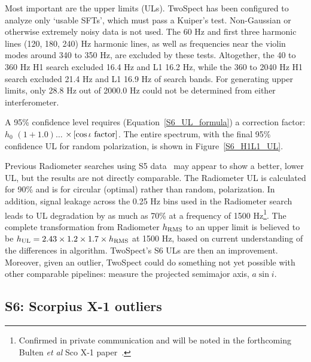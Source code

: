 Most important are the upper limits (ULs).
TwoSpect has been configured to analyze only `usable SFTs', which must pass a Kuiper's test.
Non-Gaussian or otherwise extremely noisy data is not used.
The 60 Hz and first three harmonic lines (120, 180, 240) Hz harmonic lines, as well as frequencies near the violin modes around 340 to 350 Hz, are excluded by these tests.
Altogether, the 40 to 360 Hz H1 search excluded 16.4 Hz and L1 16.2 Hz, while the 360 to 2040 Hz H1 search excluded 21.4 Hz and L1 16.9 Hz of search bands.
For generating upper limits, only 28.8 Hz out of 2000.0 Hz could not be determined from either interferometer.

A 95\% confidence level requires (Equation~\ref{S6_UL_formula}) a correction factor: $h_0$ $\left(1+1.0 \right)\ldots$ $\times \left[\cos \iota \textup{ factor} \right]$.
The entire spectrum, with the final 95\% confidence UL for random polarization, is shown in Figure~\ref{S6_H1L1_UL}.

Previous Radiometer searches using S5 data~\cite{AbadieStoch2011} may appear to show a better, lower UL, but the results are not directly comparable.
The Radiometer UL is calculated for 90\% and is for circular (optimal) rather than random, polarization.
In addition, signal leakage across the 0.25 Hz bins used in the Radiometer search leads to UL degradation by as much as 70\% at a frequency of 1500 Hz\footnote{Confirmed in private communication and will be noted in the forthcoming Bulten \textit{et al} Sco X-1 paper~\cite{ScoX1MDC2014DCC}.}.
The complete transformation from Radiometer $h_\textup{RMS}$ to an upper limit is believed to be $h_\textup{UL} = 2.43\times1.2\times1.7\times h_\textup{RMS}$ at 1500 Hz, based on current understanding of the differences in algorithm.
TwoSpect's S6 ULs are then an improvement.
Moreover, given an outlier, TwoSpect could do something not yet possible with other comparable pipelines: measure the projected semimajor axis, $a \sin i$.

\subsection{S6: Scorpius X-1 outliers}

